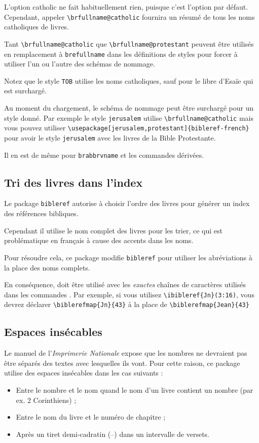 \documentclass{ltxdoc}
\begin{document}
L'option \textsf{catholic} ne fait habituellement rien, puisque c'est l'option par défaut. Cependant, appeler  \verb!\brfullname@catholic! fournira un résumé de tous les noms catholiques de livres.

Tant \verb|\brfullname@catholic| que \verb|\brfullname@protestant| peuvent être utilisés en remplacement à  \verb|brefullname| dans les définitions de styles pour forcer à utiliser l'un ou l'autre des schémas de nommage.

Notez que le style \verb|TOB| utilise les noms catholiques, sauf pour le libre d'Esaïe qui est surchargé.

Au moment du chargement, le schéma de nommage peut être surchargé pour un style donné. Par exemple le style \verb|jerusalem| utilise \verb|\brfullname@catholic| mais vous pouvez utiliser \verb|\usepackage[jerusalem,protestant]{bibleref-french}| pour avoir le style \verb|jerusalem| avec les livres de la Bible Protestante.

Il en est de même pour \verb|brabbrvname| et les commandes dérivées.

\subsection{Tri des livres dans l'index}

Le package \verb|bibleref| autorise à choisir l'ordre des livres pour générer un index des références bibliques.

Cependant il utilise le nom complet des livres pour les trier, ce qui est problématique en français à cause des accents dans les noms.

Pour résoudre cela, ce package modifie \verb|bibleref| pour utiliser les abréviations à la place des noms complets.
 
En conséquence,  doit être utilisé avec les \emph{exactes} chaînes de caractères utilisés dans les commandes . Par exemple, si vous utilisez \verb|\ibibleref{Jn}(3:16)|, vous devrez déclarer \verb|\biblerefmap{Jn}{43}| à la place de \verb|\biblerefmap{Jean}{43}|

\subsection{Espaces insécables}

Le manuel de l'\emph{Imprimerie Nationale} expose que les nombres ne devraient pas être séparés des textes avec lesquelles ils vont. Pour cette raison, ce package utilise des espaces insécables dans les cas suivants :
\begin{itemize}
\item Entre le nombre et le nom quand le nom d'un livre contient un nombre (par ex. 2 Corinthiens) ;
\item Entre le nom du livre et le numéro de chapitre ;
\item Après un tiret demi-cadratin (--) dans un intervalle de versets.

\end{itemize}
\end{document}

